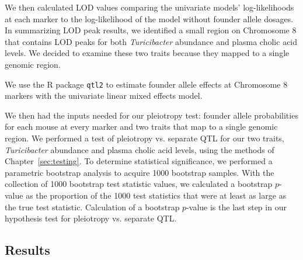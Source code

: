 \documentclass[oneside]{book}\usepackage[]{graphicx}\usepackage[]{color}
\begin{document}
We then calculated LOD values comparing the univariate models' 
log-likelihoods at each marker to the log-likelihood of 
the model without founder allele dosages. 
In summarizing LOD peak results, we identified a 
small region on Chromosome 8 that contains LOD peaks for both 
\emph{Turicibacter} abundance and plasma cholic acid levels. We decided to examine these two traits because they mapped to a single genomic region.



We use the R package \texttt{qtl2} to estimate founder allele effects 
at Chromosome 8 markers with
the univariate linear mixed effects model. 



We then had the inputs needed for our pleiotropy test: 
founder allele probabilities for each mouse at every 
marker and two traits that map to a single genomic region. 
We performed a test of pleiotropy vs. separate QTL for our two traits, 
\emph{Turicibacter} abundance and plasma cholic acid levels, 
using the methods of Chapter~\ref{sec:testing}. 
To determine statistical significance, we performed a 
parametric bootstrap analysis to acquire 1000 bootstrap samples. 
With the collection of 1000 bootstrap test statistic values, we calculated a 
bootstrap $p$-value as the proportion of the 1000 test statistics
that were at least as large as the true test statistic. 
Calculation of a bootstrap $p$-value is the last step in our hypothesis test for pleiotropy vs. separate QTL.



\subsection{Results}
\end{document}
